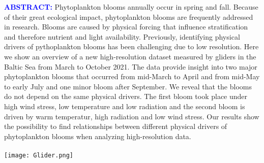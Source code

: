 \documentclass[../Main.tex]{subfiles}
\begin{document}
\begin{tcolorbox}[colback=light-orange, boxrule=0pt]
  \begin{multicols}{3}
    \textcolor{blue}{\textbf{ABSTRACT:}}
Phytoplankton blooms annually occur in spring and fall.
Because of their great ecological impact, phytoplankton blooms are frequently addressed in research.
Blooms are caused by physical forcing that influence stratification and therefore nutrient and light availability.
Previously, identifying physical drivers of pythoplankton blooms has been challenging due to low resolution.
%
Here we show an overview of a new high-resolution dataset measured by gliders in the Baltic Sea from March to October 2021.
The data provide insight into two major phytoplankton blooms that occurred from mid-March to April and from mid-May to early July and one minor bloom after September.
We reveal that the blooms do not depend on the same physical drivers.
The first bloom took place under high wind stress, low temperature and low radiation and the second bloom is driven by warm temperatur, high radiation and low wind stress.
Our results show the possibility to find relationships between different physical drivers of phytoplankton blooms when analyzing high-resolution data.
\ \\
\ \\
    \texttt{[image: Glider.png]}
 \end{multicols}
\end{tcolorbox}
\end{document}
